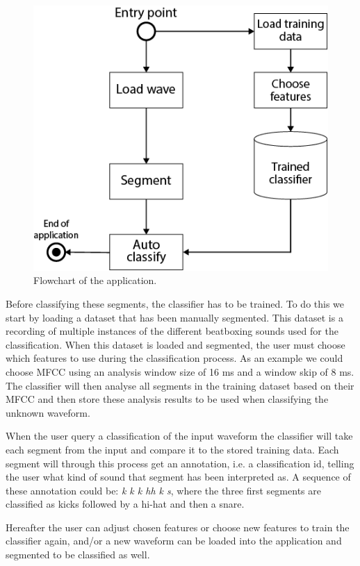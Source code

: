 \begin{figure}
\begin{center}
\includegraphics[scale=0.6]{fig/Application_flowchart.png}
\caption{Flowchart of the application.}
\label{app-flowchart}
\end{center}
\end{figure}

Before classifying these segments, the classifier has to be trained. To do this we start by loading a dataset that has been manually segmented. This dataset is a recording of multiple instances of the different beatboxing sounds used for the classification. When this dataset is loaded and segmented, the user must choose which features to use during the classification process. As an example we could choose MFCC using an analysis window size of 16 ms and a window skip of 8 ms. The classifier will then analyse all segments in the training dataset based on their MFCC and then store these analysis results to be used when classifying the unknown waveform.

When the user query a classification of the input waveform the classifier will take each segment from the input and compare it to the stored training data. Each segment will through this process get an annotation, i.e. a classification id, telling the user what kind of sound that segment has been interpreted as. A sequence of these annotation could be: \textit{k k k hh k s}, where the three first segments are classified as kicks followed by a hi-hat and then a snare.

Hereafter the user can adjust chosen features or choose new features to train the classifier again, and/or a new waveform can be loaded into the application and segmented to be classified as well.